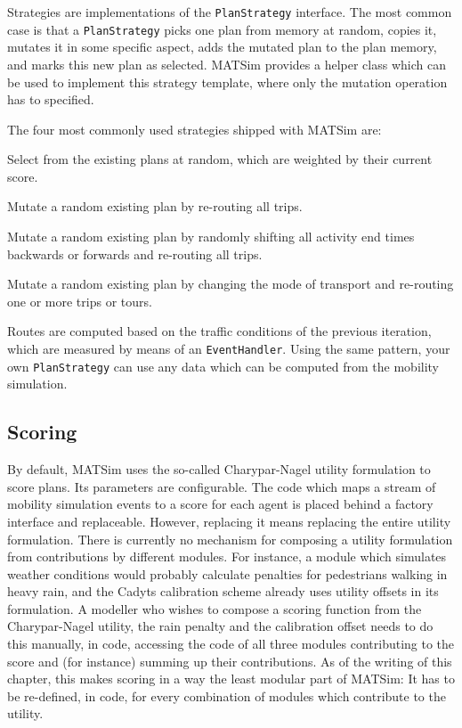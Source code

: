 Strategies are implementations of the \lstinline$PlanStrategy$ interface. 
The most common case is that a \lstinline$PlanStrategy$ picks one plan from memory
at random, copies it, mutates it in some specific aspect, adds the mutated plan to the plan memory, and
marks this new plan as selected. MATSim provides a helper class which can be used
to implement this strategy template, where only the mutation operation has to specified.

The four most commonly used strategies shipped with MATSim are:

\begin{compactitem}
\item Select from the existing plans at random, which are weighted by their current score.
\item Mutate a random existing plan by re-routing all trips.
\item Mutate a random existing plan by randomly shifting all activity end times backwards or forwards and re-routing 
all trips.
\item Mutate a random existing plan by changing the mode of transport and re-routing one or more trips or tours.
\end{compactitem}

Routes are computed based on the traffic conditions of the previous iteration, which are measured
by means of an \lstinline$EventHandler$. Using the same pattern, your own \lstinline$PlanStrategy$ can use any data which
can be computed from the mobility simulation.

\subsection{Scoring}
\label{sec:scoring-extension-point}

By default, MATSim uses the so-called Charypar-Nagel utility formulation to score plans. Its parameters
are configurable.
The code which maps a stream of mobility simulation events to a score for each agent is placed behind a factory
 interface and replaceable. However, replacing it means replacing the entire utility formulation. There is
 currently no mechanism for composing a utility formulation from contributions by different modules.
For instance, a module which simulates weather conditions would probably calculate penalties for pedestrians
  walking in heavy rain, and the Cadyts calibration scheme already uses utility offsets in its formulation. A modeller
  who wishes to compose a scoring function from the Charypar-Nagel utility, the rain penalty and the calibration offset
  needs to do this manually, in code, accessing the code of all three modules contributing to the score and (for instance) summing
  up their contributions. As of the writing of this chapter, this makes scoring in a way the least modular part of MATSim: It has to 
be re-defined, in code, for every combination of modules which contribute to the utility.

